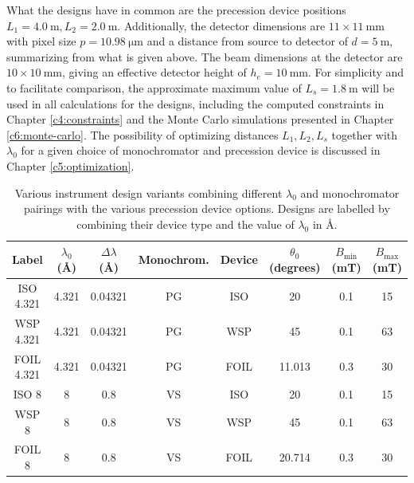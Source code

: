 What the designs have in common are the precession device positions $L_1 = \SI{4.0}{\meter}, L_2 = \SI{2.0}{\meter}$. Additionally, the detector dimensions are $11\times 11~\unit{\milli\meter}$ with pixel size $p = \SI{10.98}{\micro\meter}$ and a distance from source to detector of $d = \SI{5}{\meter}$, summarizing from what is given above. The beam dimensions at the detector are $10\times 10~\unit{\milli\meter}$, giving an effective detector height of $h_e =\SI{10}{\milli\meter}$. For simplicity and to facilitate comparison, the approximate maximum value of $L_s = \SI{1.8}{\meter}$ will be used in all calculations for the designs, including the computed constraints in Chapter \ref{c4:constraints} and the Monte Carlo simulations presented in Chapter \ref{c6:monte-carlo}. The possibility of optimizing distances $L_1, L_2, L_s$ together with $\lambda_0$ for a given choice of monochromator and precession device is discussed in Chapter \ref{c5:optimization}.  




\begin{table}[h!]
	\centering
	\begin{tabular}{ c|c c c c c c c }
		\toprule
		Label & $\lambda_0$ (Å) & $\Delta\lambda$ (Å) & Monochrom. & Device & $\theta_0$ (degrees) & $B_{\text{min}}$ (mT) & $B_{\text{max}}$ (mT) \\
		\midrule
		ISO 4.321 & 4.321 & 0.04321 & PG & ISO & 20 & 0.1 & 15 \\
		WSP 4.321 & 4.321 & 0.04321 & PG & WSP & 45 & 0.1 & 63 \\
		FOIL 4.321 & 4.321 & 0.04321 & PG & FOIL & 11.013 & 0.3 & 30 \\
		ISO 8 & 8 & 0.8 & VS & ISO & 20 & 0.1 & 15 \\
		WSP 8 & 8 & 0.8 & VS & WSP & 45 & 0.1 & 63 \\
		FOIL 8 & 8 & 0.8 & VS & FOIL & 20.714 & 0.3 & 30 \\
		\bottomrule
	\end{tabular}
	\caption{Various instrument design variants combining different $\lambda_0$ and monochromator pairings with the various precession device options. Designs are labelled by combining their device type and the value of $\lambda_0$ in Å.}
	\label{tab:design-variants}
\end{table}

